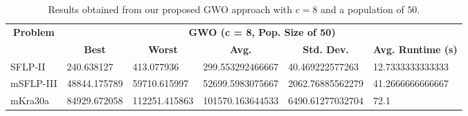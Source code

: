 \begin{table}[h!]
	\begin{adjustwidth}{-1.18in}{}
		\centering
		\begin{tabular}{|l|l|l|l|l|l|}
			\hline
			\multicolumn{1}{|c|}{\multirow{2}{*}{\textbf{Problem}}} & \multicolumn{5}{c|}{\textbf{GWO (c = 8, Pop. Size of 50)}} \\ \cline{2-6} 
			\multicolumn{1}{|c|}{}                                  & \multicolumn{1}{c|}{\textbf{Best}} & \multicolumn{1}{c|}{\textbf{Worst}} & \multicolumn{1}{c|}{\textbf{Avg.}} & \multicolumn{1}{c|}{\textbf{Std. Dev.}} & \multicolumn{1}{c|}{\textbf{Avg. Runtime (s)}} \\ \hline
			SFLP-II                                                 & 240.638127                                  & 413.077936                                   & 299.553292466667                     & 40.469222577263                                 & 12.7333333333333                                  \\ \hline
			mSFLP-III                                               & 48844.175789                                & 59710.615997                                 & 52699.5983075667						         & 2062.76885562279                              & 41.2666666666667                               \\ \hline
			mKra30a                                               & 84929.672058                                & 112251.415863                                 &
			101570.163644533							&
			6490.61277032704							&
			72.1						\\ \hline
		\end{tabular}
	\end{adjustwidth}
	\caption{Results obtained from our proposed GWO approach with $c = 8$ and a population of $50$.}
	\label{approach-gwo-c8-p50-results}
\end{table}

